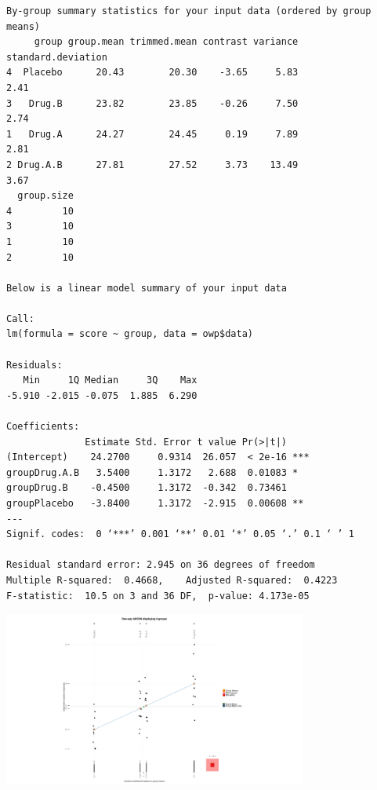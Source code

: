 \begin{frame}
\begin{enumerate}
\begin{verbatim}
By-group summary statistics for your input data (ordered by group means)
     group group.mean trimmed.mean contrast variance standard.deviation
4  Placebo      20.43        20.30    -3.65     5.83               2.41
3   Drug.B      23.82        23.85    -0.26     7.50               2.74
1   Drug.A      24.27        24.45     0.19     7.89               2.81
2 Drug.A.B      27.81        27.52     3.73    13.49               3.67
  group.size
4         10
3         10
1         10
2         10

Below is a linear model summary of your input data

Call:
lm(formula = score ~ group, data = owp$data)

Residuals:
   Min     1Q Median     3Q    Max 
-5.910 -2.015 -0.075  1.885  6.290 

Coefficients:
              Estimate Std. Error t value Pr(>|t|)    
(Intercept)    24.2700     0.9314  26.057  < 2e-16 ***
groupDrug.A.B   3.5400     1.3172   2.688  0.01083 *  
groupDrug.B    -0.4500     1.3172  -0.342  0.73461    
groupPlacebo   -3.8400     1.3172  -2.915  0.00608 ** 
---
Signif. codes:  0 ‘***’ 0.001 ‘**’ 0.01 ‘*’ 0.05 ‘.’ 0.1 ‘ ’ 1

Residual standard error: 2.945 on 36 degrees of freedom
Multiple R-squared:  0.4668,	Adjusted R-squared:  0.4223 
F-statistic:  10.5 on 3 and 36 DF,  p-value: 4.173e-05

\end{verbatim}
\begin{center}
\includegraphics[width=10cm]{img/aovgr2.png}
\end{center}
  \end{enumerate}
\end{frame}
